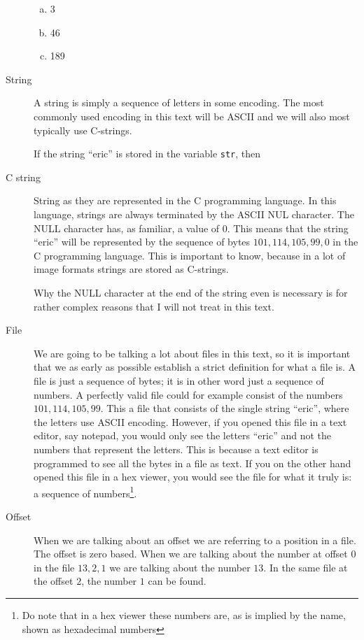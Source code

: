 \begin{description}
\begin{Exercise}[label={n-to-hex}]
    \begin{enumerate}[(a)]
    \item 3
    \item 46
    \item 189
    \end{enumerate}

  \end{Exercise}


\item[String] A string is simply a sequence of letters in some
  encoding. The most commonly used encoding in this text will be
  ASCII \cite{rfc20} and we will also most typically use C-strings.

  If the string ``eric'' is stored in the variable \texttt{str}, then

\item[C string] String as they are represented in the C programming
  language. In this language, strings are always terminated by the
  ASCII NUL character\cite{kernighan1988c}. The NULL character has, as
  familiar, a value of $0$. This means that the string ``eric'' will
  be represented by the sequence of bytes $101,114,105,99, 0$ in the C
  programming language. This is important to know, because in a lot of
  image formats strings are stored as C-strings.

  Why the NULL character at the end of the string even is necessary is
  for rather complex reasons that I will not treat in this text.

\item[File] We are going to be talking a lot about files in this text,
  so it is important that we as early as possible establish a strict
  definition for what a file is. A file is just a sequence of bytes;
  it is in other word just a sequence of numbers. A perfectly valid
  file could for example consist of the numbers $101,114,105,99$. This
  a file that consists of the single string ``eric'', where the
  letters use ASCII encoding. However, if you opened this file in a
  text editor, say notepad, you would only see the letters ``eric''
  and not the numbers that represent the letters. This is because a
  text editor is programmed to see all the bytes in a file as text. If
  you on the other hand opened this file in a hex viewer, you would
  see the file for what it truly is: a sequence of numbers\footnote{Do
    note that in a hex viewer these numbers are, as is implied by the
    name, shown as hexadecimal numbers}.


\item[Offset] When we are talking about an offset we are referring to
  a position in a file. The offset is zero based. When we are talking
  about the number at offset 0 in the file $13,2,1$ we are talking
  about the number $13$. In the same file at the offset $2$, the
  number $1$ can be found.



\end{description}
